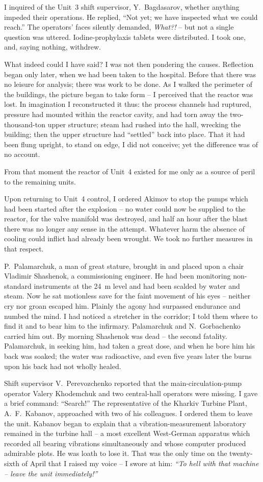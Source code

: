 \documentclass[openright]{bookest}
\begin{document}
I inquired of the Unit~3 shift supervisor, Y.~Bagdasarov, whether anything impeded their operations. He replied, ``Not yet; we have inspected what we could reach.'' The operators' faces silently demanded, \textit{What?!} -- but not a single question was uttered. Iodine-prophylaxis tablets were distributed. I took one, and, saying nothing, withdrew.

What indeed could I have said? I was not then pondering the causes. Reflection began only later, when we had been taken to the hospital. Before that there was no leisure for analysis; there was work to be done. As I walked the perimeter of the buildings, the picture began to take form -- I perceived that the reactor was lost. In imagination I reconstructed it thus: the process channels had ruptured, pressure had mounted within the reactor cavity, and had torn away the two-thousand-ton upper structure; steam had rushed into the hall, wrecking the building; then the upper structure had ``settled'' back into place. That it had been flung upright, to stand on edge, I did not conceive; yet the difference was of no account.

From that moment the reactor of Unit~4 existed for me only as a source of peril to the remaining units.

Upon returning to Unit~4 control, I ordered Akimov to stop the pumps which had been started after the explosion -- no water could now be supplied to the reactor, for the valve manifold was destroyed, and half an hour after the blast there was no longer any sense in the attempt. Whatever harm the absence of cooling could inflict had already been wrought. We took no further measures in that respect.

P.~Palamarchuk, a man of great stature, brought in and placed upon a chair Vladimir Shashenok, a commissioning engineer. He had been monitoring non-standard instruments at the \qty{+24}{\metre} level and had been scalded by water and steam. Now he sat motionless save for the faint movement of his eyes -- neither cry nor groan escaped him. Plainly the agony had surpassed endurance and numbed the mind. I had noticed a stretcher in the corridor; I told them where to find it and to bear him to the infirmary. Palamarchuk and N.~Gorbachenko carried him out. By morning Shashenok was dead -- the second fatality. Palamarchuk, in seeking him, had taken a great dose, and when he bore him his back was soaked; the water was radioactive, and even five years later the burns upon his back had not wholly healed.

Shift supervisor V.~Perevozchenko reported that the main-circulation-pump operator Valery Khodemchuk and two central-hall operators were missing. I gave a brief command: ``Search!'' The representative of the Kharkiv Turbine Plant, A.~F.~Kabanov, approached with two of his colleagues. I ordered them to leave the unit. Kabanov began to explain that a vibration-measurement laboratory remained in the turbine hall -- a most excellent West-German apparatus which recorded all bearing vibrations simultaneously and whose computer produced admirable plots. He was loath to lose it. That was the only time on the twenty-sixth of April that I raised my voice -- I swore at him: \textit{``To hell with that machine -- leave the unit immediately!''}
\end{document}
